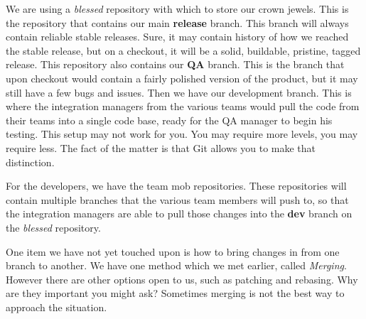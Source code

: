 
We are using a \emph{blessed} repository with which to store our crown jewels.
This is the repository that contains our main \textbf{release} branch.
This branch will always contain reliable stable releases.
Sure, it may contain history of how we reached the stable release, but on a checkout, it will be a solid, buildable, pristine, tagged release.
This repository also contains our \textbf{QA} branch.
This is the branch that upon checkout would contain a fairly polished version of the product, but it may still have a few bugs and issues.
Then we have our development branch.
This is where the integration managers from the various teams would pull the code from their teams into a single code base, ready for the QA manager to begin his testing.
This setup may not work for you.
You may require more levels, you may require less.
The fact of the matter is that Git allows you to make that distinction.

For the developers, we have the team mob repositories.
These repositories will contain multiple branches that the various team members will push to, so that the integration managers are able to pull those changes into the \textbf{dev} branch on the \emph{blessed} repository.

One item we have not yet touched upon is how to bring changes in from one branch to another.
We have one method which we met earlier, called \emph{Merging}.
However there are other options open to us, such as patching and rebasing.
Why are they important you might ask? Sometimes merging is not the best way to approach the situation.

